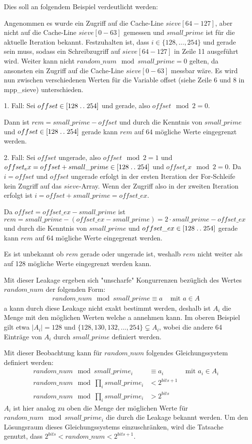 Dies soll an folgendem Beispiel verdeutlicht werden:

Angenommen es wurde ein Zugriff auf die Cache-Line $sieve[64-127]$, aber nicht auf die Cache-Line $sieve[0-63]$ gemessen und $small\_prime$ ist für die aktuelle Iteration bekannt. Festzuhalten ist, dass $i \in \{128,...,254\}$ und gerade sein muss, sodass ein Schreibzugriff auf $sieve[64-127]$ in Zeile 11 ausgeführt wird.
Weiter kann nicht $random\_num \mod small\_prime = 0$ gelten, da ansonsten ein Zugriff auf die Cache-Line $sieve[0-63]$ messbar wäre. 
Es wird nun zwischen verschiedenen Werten für die Variable offset (siehe Zeile 6 und 8 in mpp_sieve) unterschieden.

1. Fall: Sei $offset \in [128\mathrel{{.}\,{.}}\nobreak254]$ und gerade, also $offset \mod 2 = 0$. 

Dann ist $rem = small\_prime - offset$ und durch die Kenntnis von $small\_prime$ und $offset \in [128\mathrel{{.}\,{.}}\nobreak254]$ gerade kann $rem$ auf 64 mögliche Werte eingegrenzt werden.

2. Fall: Sei $offset$ ungerade, also $offset \mod 2 = 1$ und $offset_ex = offset + small\_prime \in [128\mathrel{{.}\,{.}}\nobreak254]$ und $offset_ex \mod 2 = 0$. Da $i=offset$ und $offset$ ungerade erfolgt in der ersten Iteration der For-Schleife kein Zugriff auf das $sieve$-Array. Wenn der Zugriff also in der zweiten Iteration erfolgt ist $i = offset + small\_prime = offset\_ex$.

Da $offset = offset\_ex - small\_prime$ ist $rem = small\_prime - (offset\_ex - small\_prime) = 2 \cdot small\_prime - offset\_ex$ und durch die Kenntnis von $small\_prime$ und $offset\_ex \in [128\mathrel{{.}\,{.}}\nobreak254]$ gerade kann $rem$ auf 64 mögliche Werte eingegrenzt werden.

Es ist unbekannt ob $rem$ gerade oder ungerade ist, weshalb $rem$ nicht weiter als auf 128 mögliche Werte eingegrenzt werden kann.

Mit dieser Leakage ergeben sich "unscharfe" Kongurrenzen bezüglich des Wertes $random\_num$ der folgenden Form:
\begin{align}
    random\_num \mod small\_prime \equiv a &\text{ mit } a \in A
\end{align}
a kann durch diese Leakage nicht exakt bestimmt werden, deshalb ist $A_i$ die Menge mit den möglichen Werten welche a annehmen kann.
Im oberen Beispiel gilt etwa $|A_i| = 128$ und $\{128,130,132,...,254\} \subsetneq A_i$, wobei die andere 64 Einträge von $A_i$ durch $small\_prime$ definiert werden.

Mit dieser Beobachtung kann für $random\_num$ folgendes Gleichungssystem definiert werden:
\begin{align*}
    random\_num \mod small\_prime_i &\equiv a_i &\text{ mit } a_i \in A_i\\
    random\_num \mod \prod_i small\_prime_i &< 2^{bits+1} \\
    random\_num \mod \prod_i small\_prime_i &> 2^{bits}
\end{align*}
$A_i$ ist hier analog zu oben die Menge der möglichen Werte für $random\_num \mod small\_prime_i$ die durch die Leakage bekannt werden.
Um den Lösungsraum dieses Gleichungssystems einzuschränken, wird die Tatsache genutzt, dass $2^{bits} < random\_num < 2^{bits+1}$.

